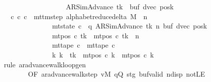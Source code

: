 \begin{isabellebody}
\ \ \ \ \ \ \ \ \ \ \ \ \ \ \ \ \ \ \ {\isacharparenleft}{\kern0pt}AR{\isacharunderscore}{\kern0pt}SimAdvance{\isacharcomma}{\kern0pt}\ tk{\isacharcomma}{\kern0pt}\ {}{\isacharcomma}{\kern0pt}\ buf{\isacharcomma}{\kern0pt}\ dvec{\isacharcomma}{\kern0pt}\ posk{\isacharparenright}{\kern0pt}{\isachardoublequoteclose}\isanewline
\ \ \ {\isachardoublequoteopen}{\isasymexists}c{\isacharprime}{\kern0pt}{\isachardot}{\kern0pt}\ {\isacharparenleft}{\kern0pt}c{}{\isacharcomma}{\kern0pt}\ c{\isacharprime}{\kern0pt}{\isacharparenright}{\kern0pt}\ {\isasymin}\ {\isacharparenleft}{\kern0pt}mttm{\isacharunderscore}{\kern0pt}step\ {\isacharparenleft}{\kern0pt}alphabet{\isacharunderscore}{\kern0pt}reduce{\isacharunderscore}{\kern0pt}delta\ M{\isacharparenright}{\kern0pt}{\isacharparenright}{\kern0pt}\ {\isacharcircum}{\kern0pt}{\isacharcircum}{\kern0pt}\ n\isanewline
\ \ \ \ \ \ \ \ \ \ \ \ \ \ {\isasymand}\ mt{\isacharunderscore}{\kern0pt}state\ c{\isacharprime}{\kern0pt}\ {\isacharequal}{\kern0pt}\ {\isacharparenleft}{\kern0pt}q{\isacharcomma}{\kern0pt}\ AR{\isacharunderscore}{\kern0pt}SimAdvance{\isacharcomma}{\kern0pt}\ tk{\isacharcomma}{\kern0pt}\ n{\isacharcomma}{\kern0pt}\ buf{\isacharcomma}{\kern0pt}\ dvec{\isacharcomma}{\kern0pt}\ posk{\isacharparenright}{\kern0pt}\isanewline
\ \ \ \ \ \ \ \ \ \ \ \ \ \ {\isasymand}\ mt{\isacharunderscore}{\kern0pt}pos\ c{\isacharprime}{\kern0pt}\ tk\ {\isacharequal}{\kern0pt}\ mt{\isacharunderscore}{\kern0pt}pos\ c{}\ tk\ {\isacharminus}{\kern0pt}\ n\isanewline
\ \ \ \ \ \ \ \ \ \ \ \ \ \ {\isasymand}\ mt{\isacharunderscore}{\kern0pt}tape\ c{\isacharprime}{\kern0pt}\ {\isacharequal}{\kern0pt}\ mt{\isacharunderscore}{\kern0pt}tape\ c{}\isanewline
\ \ \ \ \ \ \ \ \ \ \ \ \ \ {\isasymand}\ {\isacharparenleft}{\kern0pt}{\isasymforall}k{\isacharprime}{\kern0pt}{\isachardot}{\kern0pt}\ k{\isacharprime}{\kern0pt}\ {\isasymnoteq}\ tk\ {\isasymlongrightarrow}\ mt{\isacharunderscore}{\kern0pt}pos\ c{\isacharprime}{\kern0pt}\ k{\isacharprime}{\kern0pt}\ {\isacharequal}{\kern0pt}\ mt{\isacharunderscore}{\kern0pt}pos\ c{}\ k{\isacharprime}{\kern0pt}{\isacharparenright}{\kern0pt}{\isachardoublequoteclose}\isanewline
%
\isadelimproof
\ \ %
\endisadelimproof
%
\isatagproof
{}\isamarkupfalse%
\ {\isacharparenleft}{\kern0pt}rule\ ar{\isacharunderscore}{\kern0pt}advance{\isacharunderscore}{\kern0pt}walk{\isacharunderscore}{\kern0pt}loop{\isacharunderscore}{\kern0pt}gen\isanewline
\ \ \ \ \ \ \ \ {\isacharbrackleft}{\kern0pt}OF\ ar{\isacharunderscore}{\kern0pt}advance{\isacharunderscore}{\kern0pt}walk{\isacharunderscore}{\kern0pt}step\ vM\ qQ\ stg\ buf{\isacharunderscore}{\kern0pt}valid\ ndisp\ notLE\isanewline

\end{isabellebody}
